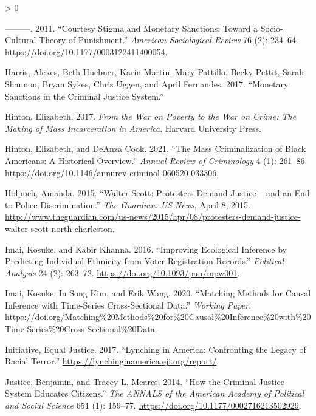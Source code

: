 \documentclass[
  12pt,
]{article}
\newlength{\cslhangindent}
\newenvironment{CSLReferences}[2] %
 {%
  \setlength{\parindent}{0pt}
  \ifodd #1 \everypar{\setlength{\hangindent}{\cslhangindent}}\ignorespaces\fi
  \ifnum #2 > 0
  \setlength{\parskip}{#2\baselineskip}
  \fi
 }%
 {}
\begin{document}
\begin{CSLReferences}{1}{0}
\leavevmode\hypertarget{ref-Harris2011}{}%
---------. 2011. {``Courtesy {Stigma} and {Monetary Sanctions}: {Toward} a {Socio}-{Cultural Theory} of {Punishment}.''} \emph{American Sociological Review} 76 (2): 234--64. \url{https://doi.org/10.1177/0003122411400054}.

\leavevmode\hypertarget{ref-Harris2017}{}%
Harris, Alexes, Beth Huebner, Karin Martin, Mary Pattillo, Becky Pettit, Sarah Shannon, Bryan Sykes, Chris Uggen, and April Fernandes. 2017. {``Monetary {Sanctions} in the {Criminal Justice System}.''}

\leavevmode\hypertarget{ref-Hinton2017}{}%
Hinton, Elizabeth. 2017. \emph{From the {War} on {Poverty} to the {War} on {Crime}: {The Making} of {Mass Incarceration} in {America}}. {Harvard University Press}.

\leavevmode\hypertarget{ref-Hinton2021}{}%
Hinton, Elizabeth, and DeAnza Cook. 2021. {``The {Mass Criminalization} of {Black Americans}: {A Historical Overview}.''} \emph{Annual Review of Criminology} 4 (1): 261--86. \url{https://doi.org/10.1146/annurev-criminol-060520-033306}.

\leavevmode\hypertarget{ref-Holpuch2015}{}%
Holpuch, Amanda. 2015. {``Walter {Scott}: Protesters Demand Justice -- and an End to Police Discrimination.''} \emph{The Guardian: US News}, April 8, 2015. \url{http://www.theguardian.com/us-news/2015/apr/08/protesters-demand-justice-walter-scott-north-charleston}.

\leavevmode\hypertarget{ref-Imai2016}{}%
Imai, Kosuke, and Kabir Khanna. 2016. {``Improving {Ecological Inference} by {Predicting Individual Ethnicity} from {Voter Registration Records}.''} \emph{Political Analysis} 24 (2): 263--72. \url{https://doi.org/10.1093/pan/mpw001}.

\leavevmode\hypertarget{ref-Imai2020}{}%
Imai, Kosuke, In Song Kim, and Erik Wang. 2020. {``Matching {Methods} for {Causal Inference} with {Time}-{Series Cross}-{Sectional Data}.''} \emph{Working Paper}. \url{https://doi.org/Matching\%20Methods\%20for\%20Causal\%20Inference\%20with\%20Time-Series\%20Cross-Sectional\%20Data}.

\leavevmode\hypertarget{ref-EqualJusticeInitiative2017}{}%
Initiative, Equal Justice. 2017. {``Lynching in {America}: {Confronting} the {Legacy} of {Racial Terror}.''} \url{https://lynchinginamerica.eji.org/report/}.

\leavevmode\hypertarget{ref-Justice2014}{}%
Justice, Benjamin, and Tracey L. Meares. 2014. {``How the {Criminal Justice System Educates Citizens}.''} \emph{The ANNALS of the American Academy of Political and Social Science} 651 (1): 159--77. \url{https://doi.org/10.1177/0002716213502929}.


\end{CSLReferences}
\end{document}
